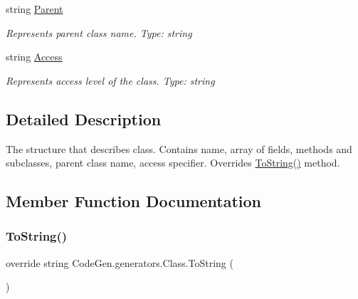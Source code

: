 \begin{DoxyCompactItemize}
string \mbox{\hyperlink{classCodeGen_1_1generators_1_1Class_a930c3a9625829896ec1201e282f3fda1}{Parent}}
\begin{DoxyCompactList}\small\item\em Represents parent class name. Type\+: string \end{DoxyCompactList}\item 
string \mbox{\hyperlink{classCodeGen_1_1generators_1_1Class_a2c50d0c9fb6f3ebd1996c03026f2788c}{Access}}
\begin{DoxyCompactList}\small\item\em Represents access level of the class. Type\+: string \end{DoxyCompactList}\end{DoxyCompactItemize}


\subsection{Detailed Description}
The structure that describes class. Contains name, array of fields, methods and subclasses, parent class name, access specifier. Overrides \mbox{\hyperlink{classCodeGen_1_1generators_1_1Class_a3d8c15ddeed8faad666f9dfdd53b758f}{To\+String()}} method. 



\subsection{Member Function Documentation}
\mbox{\label{classCodeGen_1_1generators_1_1Class_a3d8c15ddeed8faad666f9dfdd53b758f}} 
\subsubsection{\texorpdfstring{To\+String()}{ToString()}}
{\footnotesize\ttfamily override string Code\+Gen.\+generators.\+Class.\+To\+String (\begin{DoxyParamCaption}{ }\end{DoxyParamCaption})\hspace{0.3cm}{\ttfamily [inline]}}







